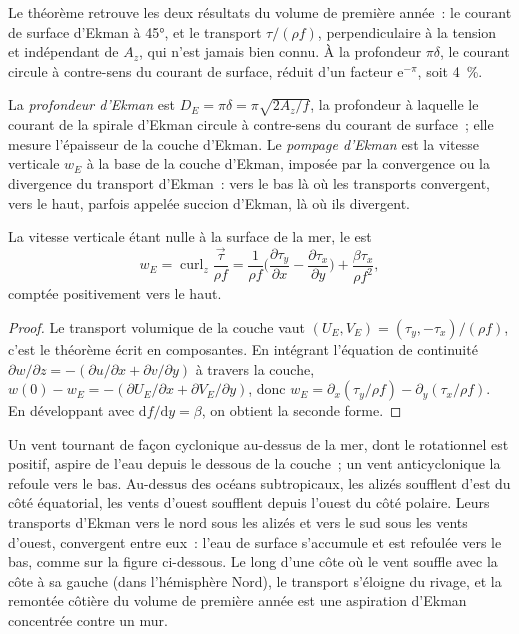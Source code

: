 Le théorème retrouve les deux résultats du volume de première année~: le courant de surface d'Ekman
à \ang{45}, et le transport $\tau/(\rho f)$, perpendiculaire à
la tension et indépendant de $A_z$, qui n'est jamais bien connu. À la
profondeur $\pi\delta$, le courant circule à contre-sens du courant de surface, réduit
d'un facteur $\mathrm e^{-\pi}$, soit \qty{4}{\percent}.

\begin{definition}\label{def:b3:ocean-dynamics:ekman-pumping}
La \emph{profondeur d'Ekman} est $D_E = \pi\delta =
\pi\sqrt{2A_z/f}$, la profondeur à laquelle le courant de la spirale d'Ekman
circule à contre-sens du courant de surface~; elle mesure l'épaisseur de la
couche d'Ekman. Le \emph{pompage d'Ekman} est la vitesse
verticale $w_E$ à la base de la couche d'Ekman, imposée par la convergence ou
la divergence du transport d'Ekman~: vers le bas là où les transports
convergent, vers le haut, parfois appelée succion d'Ekman, là où ils divergent.
\end{definition}

\begin{proposition}\label{prop:b3:ocean-dynamics:pumping}
La vitesse verticale étant nulle à la surface de la mer, le  est
\[
w_E = \operatorname{curl}_z\frac{\vec\tau}{\rho f}
= \frac{1}{\rho f}\Big(\frac{\partial\tau_y}{\partial x} -
\frac{\partial\tau_x}{\partial y}\Big) + \frac{\beta\tau_x}{\rho f^2} ,
\]
comptée positivement vers le haut.
\end{proposition}

\begin{proof}
Le transport volumique de la couche vaut $(U_E, V_E) = (\tau_y,
-\tau_x)/(\rho f)$, c'est le théorème écrit en composantes. En intégrant
l'équation de continuité $\partial w/\partial z = -(\partial u/\partial x +
\partial v/\partial y)$ à travers la couche, $w(0) - w_E = -(\partial
U_E/\partial x + \partial V_E/\partial y)$, donc $w_E = \partial_x(\tau_y/\rho
f) - \partial_y(\tau_x/\rho f)$. En développant avec $\mathrm df/\mathrm dy =
\beta$, on obtient la seconde forme.
\end{proof}

Un vent tournant de façon cyclonique au-dessus de la mer, dont le rotationnel est positif, aspire
de l'eau depuis le dessous de la couche~; un vent anticyclonique la refoule vers le bas. Au-dessus
des océans subtropicaux, les alizés soufflent d'est du côté équatorial, les
vents d'ouest soufflent depuis l'ouest du côté polaire. Leurs transports d'Ekman
vers le nord sous les alizés et vers le sud sous les vents d'ouest,
convergent entre eux~: l'eau de surface s'accumule et est refoulée vers le bas, comme
sur la figure ci-dessous. Le long d'une côte où le
vent souffle avec la côte à sa gauche (dans l'hémisphère Nord), le
transport s'éloigne du rivage, et la remontée côtière du volume de première année
est une aspiration d'Ekman concentrée contre un mur.

